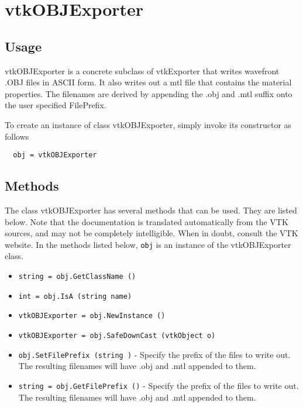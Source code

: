 \section{vtkOBJExporter}

\subsection{Usage}

 vtkOBJExporter is a concrete subclass of vtkExporter that writes wavefront
 .OBJ files in ASCII form. It also writes out a mtl file that contains the
 material properties. The filenames are derived by appending the .obj and
 .mtl suffix onto the user specified FilePrefix.


To create an instance of class vtkOBJExporter, simply
invoke its constructor as follows
\begin{verbatim}
  obj = vtkOBJExporter
\end{verbatim}
\subsection{Methods}

The class vtkOBJExporter has several methods that can be used.
  They are listed below.
Note that the documentation is translated automatically from the VTK sources,
and may not be completely intelligible.  When in doubt, consult the VTK website.
In the methods listed below, \verb|obj| is an instance of the vtkOBJExporter class.
\begin{itemize}
\item  \verb|string = obj.GetClassName ()|

\item  \verb|int = obj.IsA (string name)|

\item  \verb|vtkOBJExporter = obj.NewInstance ()|

\item  \verb|vtkOBJExporter = obj.SafeDownCast (vtkObject o)|

\item  \verb|obj.SetFilePrefix (string )| -  Specify the prefix of the files to write out. The resulting filenames
 will have .obj and .mtl appended to them.

\item  \verb|string = obj.GetFilePrefix ()| -  Specify the prefix of the files to write out. The resulting filenames
 will have .obj and .mtl appended to them.

\end{itemize}

